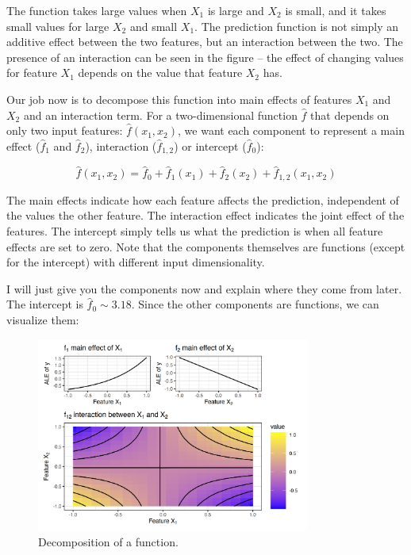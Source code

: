 \documentclass[
  11pt,
]{scrbook}
\begin{document}
The function takes large values when \(X_1\) is large and \(X_2\) is small, and it takes small values for large \(X_2\) and small \(X_1\).
The prediction function is not simply an additive effect between the two features, but an interaction between the two.
The presence of an interaction can be seen in the figure -- the effect of changing values for feature \(X_1\) depends on the value that feature \(X_2\) has.

Our job now is to decompose this function into main effects of features \(X_1\) and \(X_2\) and an interaction term.
For a two-dimensional function \(\hat{f}\) that depends on only two input features: \(\hat{f}(x_1, x_2)\), we want each component to represent a main effect (\(\hat{f}_1\) and \(\hat{f}_2\)), interaction (\(\hat{f}_{1,2}\)) or intercept (\(\hat{f}_0\)):

\[\hat{f}(x_1, x_2) = \hat{f}_0 + \hat{f}_1(x_1) + \hat{f}_2(x_2) + \hat{f}_{1,2}(x_{1},x_{2})\]

The main effects indicate how each feature affects the prediction, independent of the values the other feature.
The interaction effect indicates the joint effect of the features.
The intercept simply tells us what the prediction is when all feature effects are set to zero.
Note that the components themselves are functions (except for the intercept) with different input dimensionality.

I will just give you the components now and explain where they come from later.
The intercept is \(\hat{f}_0\sim3.18\).
Since the other components are functions, we can visualize them:

\begin{figure}

{\centering \includegraphics[width=0.8\textwidth]{images/unnamed-chunk-17-1} 

}

\caption{Decomposition of a function.}\label{fig:unnamed-chunk-17}
\end{figure}
\end{document}
